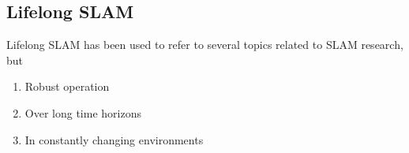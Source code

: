 \subsection{Lifelong SLAM}

Lifelong SLAM has been used to refer to several topics related to SLAM research, but 
\begin{singlespace}
    \begin{enumerate}
        \item Robust operation
        \item Over long time horizons
        \item In constantly changing environments
    \end{enumerate}
\end{singlespace}
